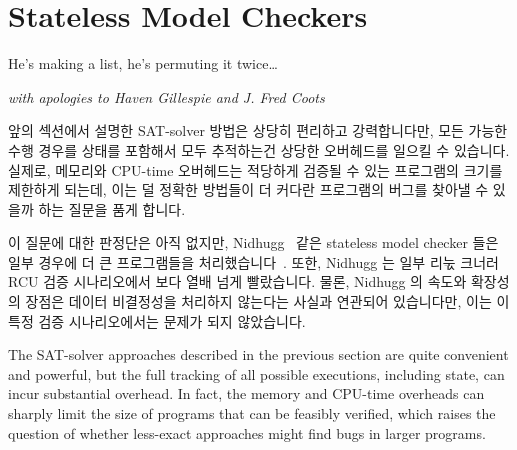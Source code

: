 
\section{Stateless Model Checkers}
\label{sec:formal:Stateless Model Checkers}
%
\epigraph{He's making a list, he's permuting it twice\dots}
	{\emph{with apologies to Haven Gillespie and J. Fred Coots}}

앞의 섹션에서 설명한 SAT-solver 방법은 상당히 편리하고 강력합니다만, 모든
가능한 수행 경우를 상태를 포함해서 모두 추적하는건 상당한 오버헤드를 일으킬 수
있습니다.
실제로, 메모리와 CPU-time 오버헤드는 적당하게 검증될 수 있는 프로그램의 크기를
제한하게 되는데, 이는 덜 정확한 방법들이 더 커다란 프로그램의 버그를 찾아낼 수
있을까 하는 질문을 품게 합니다.

이 질문에 대한 판정단은 아직 없지만, Nidhugg~\cite{CarlLeonardsson2014Nidhugg}
같은 stateless model checker 들은 일부 경우에 더 큰 프로그램들을
처리했습니다~\cite{SMC-TreeRCU}.
또한, Nidhugg 는 일부 리눇 크너러 RCU 검증 시나리오에서  보다 열배
넘게 빨랐습니다.
물론, Nidhugg 의 속도와 확장성의 장점은 데이터 비결정성을 처리하지 않는다는
사실과 연관되어 있습니다만, 이는 이 특정 검증 시나리오에서는 문제가 되지
않았습니다.
\iffalse

The SAT-solver approaches described in the previous section are quite
convenient and powerful, but the full tracking of all possible
executions, including state, can incur substantial overhead.
In fact, the memory and CPU-time overheads can sharply limit the size
of programs that can be feasibly verified, which raises the question
of whether less-exact approaches might find bugs in larger programs.

